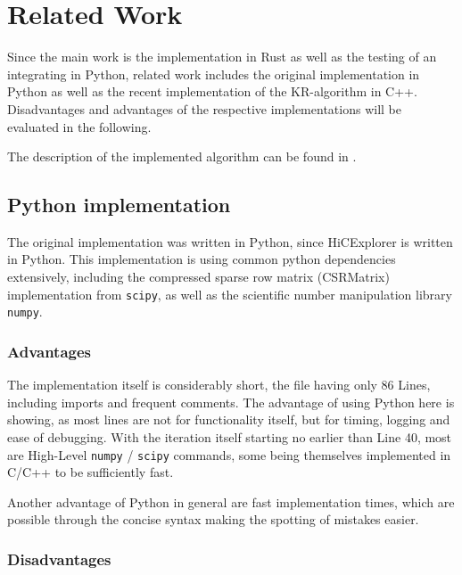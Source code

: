 \chapter{Related Work}\label{chap:relatedwork}


Since the main work is the implementation in Rust as well as the testing of an
integrating in Python, related work includes the original implementation in
Python as well as the recent implementation of the KR-algorithm in C++.
Disadvantages and advantages of the respective implementations will be
evaluated in the following.

The description of the implemented algorithm can be found in .


\section{Python implementation}\label{sec:python}

The original implementation was written in Python, since HiCExplorer is
written in Python. This implementation is using common python dependencies
extensively, including the compressed sparse row matrix (CSRMatrix)
implementation from \verb|scipy|, as well as the scientific number manipulation
library \verb|numpy|.

\subsection{Advantages}

The implementation itself is considerably short, the file having only 86 Lines,
including imports and frequent comments. The advantage of using Python here is
showing, as most lines are not for functionality itself, but for timing,
logging and ease of debugging. With the iteration itself starting no earlier
than Line 40, most are High-Level \verb|numpy| / \verb|scipy| commands, some
being themselves implemented in C/C++ to be sufficiently fast.

Another advantage of Python in general are fast implementation times, which are
possible through the concise syntax making the spotting of mistakes easier.

\subsection{Disadvantages}


